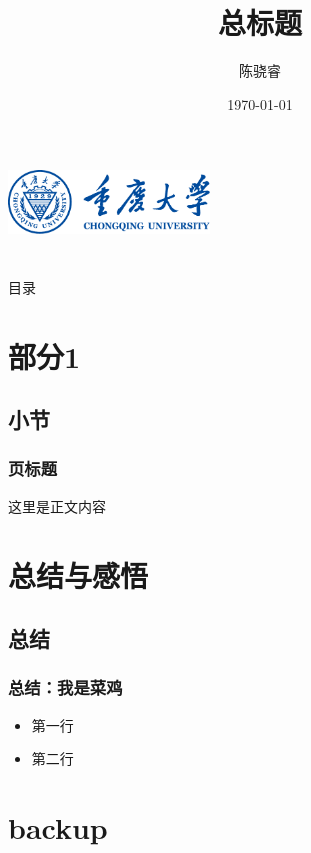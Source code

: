 \documentclass[12pt,aspectratio=169,UTF8]{beamer}
\title{总标题}
\author{陈骁睿}
\date{\today}
\institute{重庆大学物理学院}
\begin{document}
\begin{frame}[plain]
  \begin{center}
      \includegraphics[width=0.4\textwidth]{校徽+中英文校名_蓝色.pdf}
  \end{center}
  \titlepage
\end{frame}
\setcounter{framenumber}{0}

\section*{}
\begin{frame}{目录}
  \begin{multicols}{2}
    \tableofcontents[subsubsectionstyle=hide]
  \end{multicols}
\end{frame}

\section{部分1}
\subsection{小节}

\begin{frame}
  \frametitle{页标题}
  \centering
    这里是正文内容

\end{frame}


\section{总结与感悟}
\subsection{总结}
\begin{frame}
  \frametitle{总结：我是菜鸡}
  \begin{itemize}
    \item 第一行
    \item 第二行
  \end{itemize}
\end{frame}

\appendix

\section*{backup}
\end{document}

